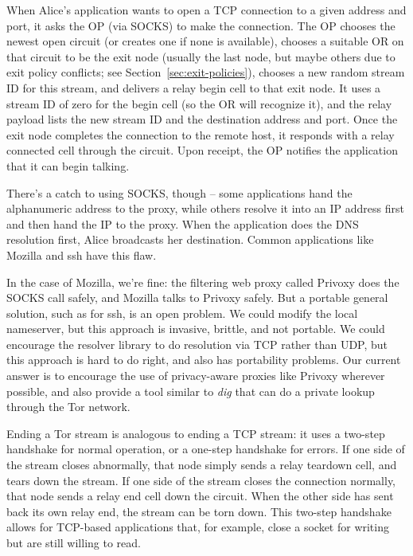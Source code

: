 \documentclass[times,10pt,twocolumn]{article}
\begin{document}
\label{subsec:tcp}

When Alice's application wants to open a TCP connection to a given
address and port, it asks the OP (via SOCKS) to make the connection. The
OP chooses the newest open circuit (or creates one if none is available),
chooses a suitable OR on that circuit to be the exit node (usually the
last node, but maybe others due to exit policy conflicts; see
Section~\ref{sec:exit-policies}), chooses a new random stream ID for
this stream,
and delivers a relay begin cell to that exit node. It uses a stream ID
of zero for the begin cell (so the OR will recognize it), and the relay
payload lists the new stream ID and the destination address and port.
Once the exit node completes the connection to the remote host, it
responds with a relay connected cell through the circuit. Upon receipt,
the OP notifies the application that it can begin talking.

There's a catch to using SOCKS, though -- some applications hand the
alphanumeric address to the proxy, while others resolve it into an IP
address first and then hand the IP to the proxy. When the application
does the DNS resolution first, Alice broadcasts her destination. Common
applications like Mozilla and ssh have this flaw.

In the case of Mozilla, we're fine: the filtering web proxy called Privoxy
does the SOCKS call safely, and Mozilla talks to Privoxy safely. But a
portable general solution, such as for ssh, is an open problem. We could
modify the local nameserver, but this approach is invasive, brittle, and
not portable. We could encourage the resolver library to do resolution
via TCP rather than UDP, but this approach is hard to do right, and also
has portability problems. Our current answer is to encourage the use of
privacy-aware proxies like Privoxy wherever possible, and also provide
a tool similar to \emph{dig} that can do a private lookup through the
Tor network.

Ending a Tor stream is analogous to ending a TCP stream: it uses a
two-step handshake for normal operation, or a one-step handshake for
errors. If one side of the stream closes abnormally, that node simply
sends a relay teardown cell, and tears down the stream. If one side
of the stream closes the connection normally, that node sends a relay
end cell down the circuit. When the other side has sent back its own
relay end, the stream can be torn down. This two-step handshake allows
for TCP-based applications that, for example, close a socket for writing
but are still willing to read.
\end{document}
